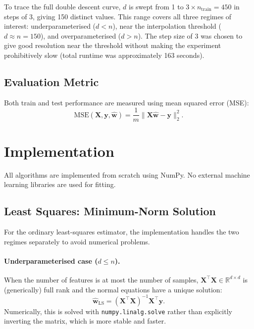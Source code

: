 \documentclass[11pt,a4paper]{article}
\begin{document}
To trace the full double descent curve, $d$ is swept from 1 to $3 \times n_{\text{train}} = 450$ in steps of 3, giving 150 distinct values. This range covers all three regimes of interest: underparameterised ($d < n$), near the interpolation threshold ($d \approx n = 150$), and overparameterised ($d > n$). The step size of 3 was chosen to give good resolution near the threshold without making the experiment prohibitively slow (total runtime was approximately 163 seconds).

\subsection{Evaluation Metric}

Both train and test performance are measured using mean squared error (MSE):
\[
    \text{MSE}(\mathbf{X}, \mathbf{y}, \hat{\mathbf{w}}) = \frac{1}{m} \|\mathbf{X}\hat{\mathbf{w}} - \mathbf{y}\|_2^2.
\]

\section{Implementation}

All algorithms are implemented from scratch using NumPy. No external machine learning libraries are used for fitting.

\subsection{Least Squares: Minimum-Norm Solution}

For the ordinary least-squares estimator, the implementation handles the two regimes separately to avoid numerical problems.

\paragraph{Underparameterised case ($d \leq n$).} When the number of features is at most the number of samples, $\mathbf{X}^\top\mathbf{X} \in \mathbb{R}^{d \times d}$ is (generically) full rank and the normal equations have a unique solution:
\[
    \hat{\mathbf{w}}_{\text{LS}} = (\mathbf{X}^\top \mathbf{X})^{-1} \mathbf{X}^\top \mathbf{y}.
\]
Numerically, this is solved with \texttt{numpy.linalg.solve} rather than explicitly inverting the matrix, which is more stable and faster.
\end{document}
